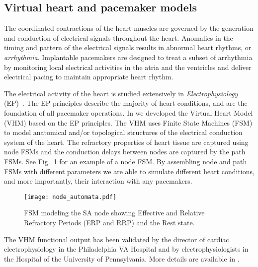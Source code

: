 \subsection{Virtual heart and pacemaker models}
\label{heartmodel}

The coordinated contractions of the heart muscles are governed by the generation and conduction of electrical signals throughout the heart. Anomalies in the timing and pattern of the electrical signals results in abnormal heart rhythms, or \emph{arrhythmia}. Implantable pacemakers are designed to treat a subset of arrhythmia by monitoring local electrical activities in the atria and the ventricles and deliver electrical pacing to maintain appropriate heart rhythm. %

The electrical activity of the heart is studied extensively in \emph{Electrophysiology} (EP)~\cite{josephson}. 
The EP principles describe the majority of heart conditions, and are the foundation of all pacemaker operations. 
In \cite{VHM_proc} we developed the Virtual Heart Model (VHM) based on the EP principles. 
The VHM uses Finite State Machines (FSM) to model anatomical and/or topological structures of the electrical conduction system of the heart. 
The refractory properties of heart tissue are captured using node FSMs and the conduction delays between nodes are captured by the path FSMs. 
See Fig.~\ref{fig:FSMSA} for an example of a node FSM. 
By assembling node and path FSMs with different parameters we are able to simulate different heart conditions, and more importantly, their interaction with any pacemakers.
\begin{figure}[t]
\centering
\texttt{[image: node\_automata.pdf]}
\caption{FSM modeling the SA node showing Effective and Relative Refractory Periods (ERP and RRP) and the Rest state.}
\label{fig:FSMSA}
\vspace{-.5cm}
\end{figure}
The VHM functional output has been validated by the director of cardiac electrophysiology in the Philadelphia VA Hospital and by electrophysiologists in the Hospital of the University of Pennsylvania. 
More details are available in \cite{VHM_proc}.

